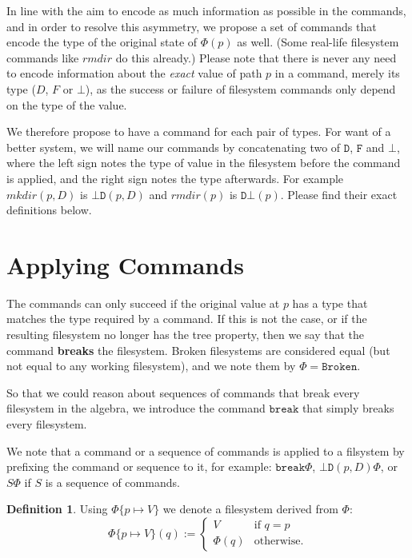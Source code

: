 \documentclass[12pt]{article}
\newcommand{\empt}{\bot}
\newcommand{\fsbroken}{\mathtt{Broken}} %
\newcommand{\FS}{\Phi} %
\newcommand{\cbrk}{\mathtt{break}}
\newcommand{\fscommand}[2]{{#1#2}}
\newcommand{\fsregcommandchar}[1]{\mathtt{#1}}
\newcommand{\fsregcommand}[2]{\fscommand{\fsregcommandchar{#1}}{\fsregcommandchar{#2}}}
\newcommand{\cbd}{\fsregcommand{\empt}{D}}
\newcommand{\cdb}{\fsregcommand{D}{\empt}}
\theoremstyle{definition}
\newtheorem{mydef}{Definition}
\begin{document}
In line with the aim to encode as much information as possible in the commands,
and in order to resolve this asymmetry, we propose a set of commands that encode
the type of the original state of $\FS(p)$ as well.
(Some real-life filesystem commands like $rmdir$ do this already.)
Please note that there is never any need to encode information about the
\emph{exact} value of path $p$ in a command, merely its type ($D$, $F$ or $\empt$),
as the success or failure of filesystem commands only depend on the type of the value.

We therefore propose to have a command for each pair of types.
For want of a better system, we will name our commands by concatenating
two of $\fsregcommandchar{D}$, $\fsregcommandchar{F}$ and $\fsregcommandchar{\empt}$, 
where the left sign notes the type of value
in the filesystem before the command is applied, and the right sign notes the type
afterwards. For example $mkdir(p,D)$ is $\cbd(p,D)$ and $rmdir(p)$ is $\cdb(p)$.
Please find their exact definitions below.


\section{Applying Commands}

The commands can only succeed if the original value at $p$ has a type that matches
the type required by a command. If this is not the case, or if the resulting
filesystem no longer has the tree property, then we say that the command
\textbf{breaks} the filesystem. Broken filesystems are considered equal
(but not equal to any working filesystem), and we note them by $\FS=\fsbroken$.

So that we could reason about sequences of commands that break every filesystem
in the algebra, we introduce the command $\cbrk$ that simply breaks every filesystem.

We note that a command or a sequence of commands is applied to a filsystem
by prefixing the command or sequence to it, for example: $\cbrk\FS$, $\cbd(p,D)\FS$, 
or $S\FS$ if $S$ is a sequence of commands.

\begin{mydef}
Using $\FS\{p\mapsto V\}$ we denote a filesystem derived from $\FS$:
\[ \FS\{p\mapsto V\}(q) :=
   \begin{cases}
   V &\mbox{if~} q=p\\
   \FS(q) &\mbox{otherwise.}
   \end{cases}
\]
\end{mydef}
\end{document}
